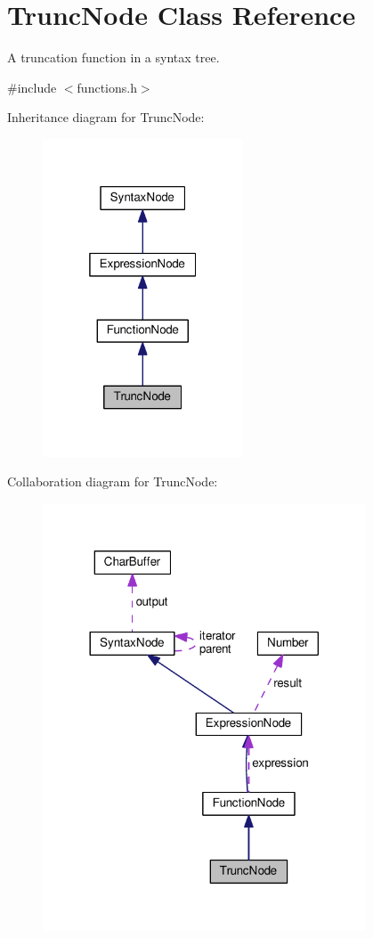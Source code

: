 \hypertarget{classTruncNode}{}\section{Trunc\+Node Class Reference}
\label{classTruncNode}


A truncation function in a syntax tree.  




{\ttfamily \#include $<$functions.\+h$>$}



Inheritance diagram for Trunc\+Node\+:
\nopagebreak
\begin{figure}[H]
\begin{center}
\leavevmode
\includegraphics[width=169pt]{dd/de5/classTruncNode__inherit__graph}
\end{center}
\end{figure}


Collaboration diagram for Trunc\+Node\+:
\nopagebreak
\begin{figure}[H]
\begin{center}
\leavevmode
\includegraphics[width=272pt]{d8/d54/classTruncNode__coll__graph}
\end{center}
\end{figure}
